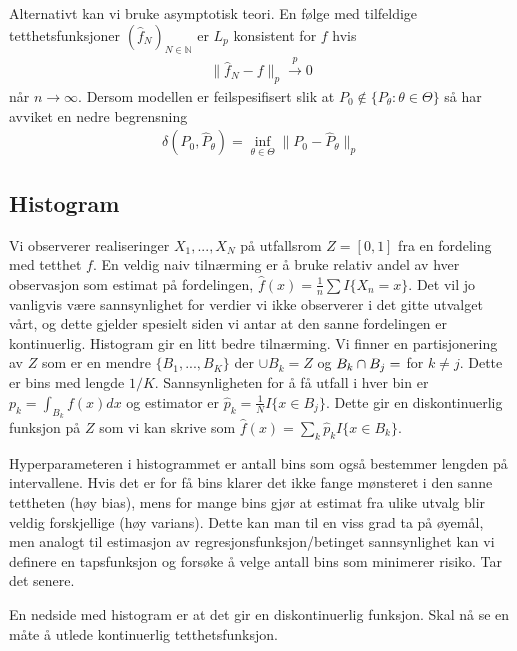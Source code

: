 Alternativt kan vi bruke asymptotisk teori. En følge med tilfeldige tetthetsfunksjoner $(\hat{f}_N)_{N\in\mathbb{N}}$ er $L_p$ konsistent for $f$ hvis
\begin{align}
\lVert \hat{f}_N-f\rVert_p \overset{p}{\to} 0 
\end{align}
når $n \to \infty$. Dersom modellen er feilspesifisert slik at $P_0 \notin \{P_{\theta}:\theta \in \Theta\}$ så har avviket en nedre begrensning
\begin{align}
\delta(P_0,\hat{P}_\theta) = \inf_{\theta \in \Theta}\lVert P_0-\hat{P}_\theta  \rVert_p
\end{align}
\subsection{Histogram}
Vi observerer realiseringer $X_1,...,X_N$ på utfallsrom $Z=[0,1]$ fra en fordeling med tetthet $f$. En veldig naiv tilnærming er å bruke relativ andel av hver observasjon som estimat på fordelingen, $\hat{f}(x) = \frac{1}{n}\sum I\{X_n = x\}$. Det vil jo vanligvis være sannsynlighet for verdier vi ikke observerer i det gitte utvalget vårt, og dette gjelder spesielt siden vi antar at den sanne fordelingen er kontinuerlig. Histogram gir en litt bedre tilnærming. Vi finner en partisjonering av $Z$ som er en mendre $\{B_1,...,B_K\}$ der $\cup B_k = Z$ og $ B_k\cap B_j = \empty$ for $k\neq j$. Dette er bins med lengde $1/K$. Sannsynligheten for å få utfall i hver bin er $p_k = \int_{B_k} f(x)dx$ og estimator er $\hat{p}_k = \frac{1}{N}I\{x\in B_j\}$. Dette gir en diskontinuerlig funksjon på $Z$ som vi kan skrive som $\hat{f}(x)=\sum_k \hat{p}_kI\{x\in B_k\}$.

Hyperparameteren i histogrammet er antall bins som også bestemmer lengden på intervallene. Hvis det er for få bins klarer det ikke fange mønsteret i den sanne tettheten (høy bias), mens for mange bins gjør at estimat fra ulike utvalg blir veldig forskjellige (høy varians). Dette kan man til en viss grad ta på øyemål, men analogt til estimasjon av regresjonsfunksjon/betinget sannsynlighet kan vi definere en tapsfunksjon og forsøke å velge antall bins som minimerer risiko. Tar det senere.

En nedside med histogram er at det gir en diskontinuerlig funksjon. Skal nå se en måte å utlede kontinuerlig tetthetsfunksjon.
